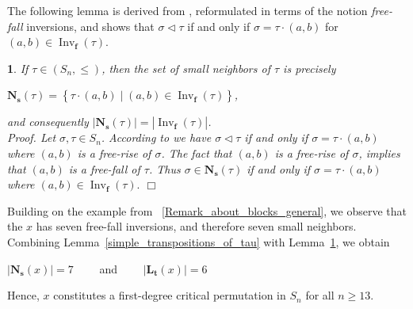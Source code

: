 \documentclass[a4 paper,12pt]{article}
\newcommand{\sma}{\triangleleft}
\newcommand{\ma}{\leqslant}
\DeclareMathOperator{\Inv}{Inv}
\newtheorem{subnum}{}[numeris]
\begin{document}
The following lemma is derived from \cite[Proposition 2.4.]{Fed}, reformulated in terms of the notion  \textit{free-fall} inversions, and   shows that
$\sigma \sma \tau$ if and only if $\sigma = \tau \cdot (a,b)$ for $(a,b)\in \Inv_{\textbf{f}}(\tau)$.



\begin{subnum}  \textit{If  $\tau\in (S_{n},\ma)$, then  the set of small neighbors of 
$\tau $ is precisely
}
\begin{center}
$\textbf{N}_{\textbf{s}}(\tau) = \left\{\tau\cdot (a,b) \mid (a,b)\in \Inv_{\textbf{f}}(\tau)\right\}$,
\end{center}
\textit{and consequently $\left|\textbf{N}_{\textbf{s}}(\tau)\right| = \left|\Inv_{\textbf{f}}(\tau)\right|$. }
\\

 



\textit{Proof.} Let $\sigma,\tau\in S_{n}$. According to  \cite[Proposition 2.4.]{Fed} we have  $\sigma\sma \tau $  if and only if $\sigma = \tau \cdot  (a,b)$ where $(a,b)$ is a free-rise of $\sigma$. The fact that $(a,b)$ is a free-rise of  $\sigma$, implies that $(a,b)$ is a free-fall of $\tau$. Thus $\sigma\in \textbf{N}_{\textbf{s}}(\tau) $ if and only if $\sigma = \tau \cdot (a,b)$ where $(a,b)\in \Inv_{\textbf{f}}(\tau).$
\hfill $\Box$ 
\label{neigh_lemma}
\end{subnum}



Building on the example from ~\ref{Remark_about_blocks_general}, we observe that the   $x$ has seven free-fall inversions, and therefore seven small neighbors. Combining Lemma~\ref{simple_transpositions_of_tau} with Lemma~\ref{neigh_lemma}, we obtain 
\begin{center}
$\left|\textbf{N}_{\textbf{s}}(x)\right| = 7$ \  \  \  \  and \  \  \  \  $\left|\textbf{L}_{\textbf{t}}(x)\right|=6$
\end{center}
 Hence, $x$ constitutes a first-degree critical permutation in $S_n$ for all $n \geq 13$.
\end{document}

